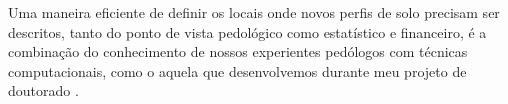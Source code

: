Uma maneira eficiente de definir os locais onde novos perfis de solo precisam 
ser descritos, tanto do ponto de vista pedológico como estatístico e financeiro,
é a combinação do conhecimento de nossos experientes pedólogos com técnicas 
computacionais, como o aquela que desenvolvemos durante meu projeto de doutorado
\cite{Samuel-RosaEtAl2015a, Samuel-RosaEtAl2015c, Samuel-RosaEtAl2015d}.

